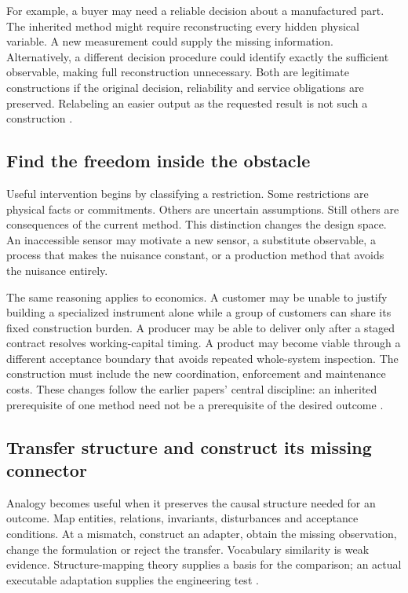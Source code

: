 \documentclass[11pt,letterpaper]{article}
\begin{document}
For example, a buyer may need a reliable decision about a manufactured part. The inherited method might require reconstructing every hidden physical variable. A new measurement could supply the missing information. Alternatively, a different decision procedure could identify exactly the sufficient observable, making full reconstruction unnecessary. Both are legitimate constructions if the original decision, reliability and service obligations are preserved. Relabeling an easier output as the requested result is not such a construction \cite{original,world,outlearn}.

\subsection{Find the freedom inside the obstacle}
Useful intervention begins by classifying a restriction. Some restrictions are physical facts or commitments. Others are uncertain assumptions. Still others are consequences of the current method. This distinction changes the design space. An inaccessible sensor may motivate a new sensor, a substitute observable, a process that makes the nuisance constant, or a production method that avoids the nuisance entirely.

The same reasoning applies to economics. A customer may be unable to justify building a specialized instrument alone while a group of customers can share its fixed construction burden. A producer may be able to deliver only after a staged contract resolves working-capital timing. A product may become viable through a different acceptance boundary that avoids repeated whole-system inspection. The construction must include the new coordination, enforcement and maintenance costs. These changes follow the earlier papers' central discipline: an inherited prerequisite of one method need not be a prerequisite of the desired outcome \cite{economy,outdesign,outexecute,outaccelerate}.

\subsection{Transfer structure and construct its missing connector}
Analogy becomes useful when it preserves the causal structure needed for an outcome. Map entities, relations, invariants, disturbances and acceptance conditions. At a mismatch, construct an adapter, obtain the missing observation, change the formulation or reject the transfer. Vocabulary similarity is weak evidence. Structure-mapping theory supplies a basis for the comparison; an actual executable adaptation supplies the engineering test \cite{gentner}.
\end{document}
